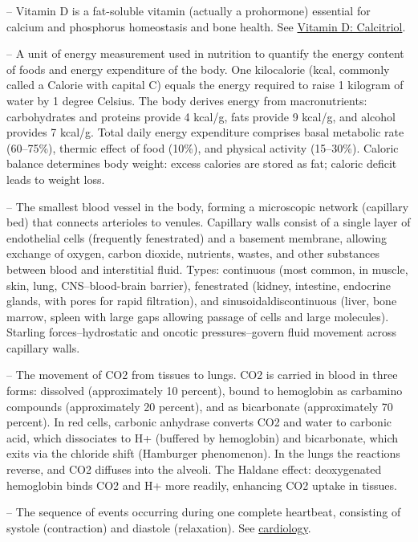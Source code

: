 -- Vitamin D is a fat-soluble vitamin (actually a prohormone) essential for calcium and phosphorus homeostasis and bone health. See \hyperlink{Vitamin D: Calcitriol}{Vitamin D: Calcitriol}.

-- A unit of energy measurement used in nutrition to quantify the energy content of foods and energy expenditure of the body. One kilocalorie (kcal, commonly called a Calorie with capital C) equals the energy required to raise 1 kilogram of water by 1 degree Celsius. The body derives energy from macronutrients: carbohydrates and proteins provide 4 kcal/g, fats provide 9 kcal/g, and alcohol provides 7 kcal/g. Total daily energy expenditure comprises basal metabolic rate (60--75\%), thermic effect of food (10\%), and physical activity (15--30\%). Caloric balance determines body weight: excess calories are stored as fat; caloric deficit leads to weight loss.

-- The smallest blood vessel in the body, forming a microscopic network (capillary bed) that connects arterioles to venules. Capillary walls consist of a single layer of endothelial cells (frequently fenestrated) and a basement membrane, allowing exchange of oxygen, carbon dioxide, nutrients, wastes, and other substances between blood and interstitial fluid. Types: continuous (most common, in muscle, skin, lung, CNS--blood-brain barrier), fenestrated (kidney, intestine, endocrine glands, with pores for rapid filtration), and sinusoidal\/discontinuous (liver, bone marrow, spleen with large gaps allowing passage of cells and large molecules). Starling forces--hydrostatic and oncotic pressures--govern fluid movement across capillary walls.

-- The movement of CO2 from tissues to lungs. CO2 is carried in blood in three forms: dissolved (approximately 10 percent), bound to hemoglobin as carbamino compounds (approximately 20 percent), and as bicarbonate (approximately 70 percent). In red cells, carbonic anhydrase converts CO2 and water to carbonic acid, which dissociates to H+ (buffered by hemoglobin) and bicarbonate, which exits via the chloride shift (Hamburger phenomenon). In the lungs the reactions reverse, and CO2 diffuses into the alveoli. The Haldane effect: deoxygenated hemoglobin binds CO2 and H+ more readily, enhancing CO2 uptake in tissues.

-- The sequence of events occurring during one complete heartbeat, consisting of systole (contraction) and diastole (relaxation). See \hyperlink{Cardiology}{cardiology}.

